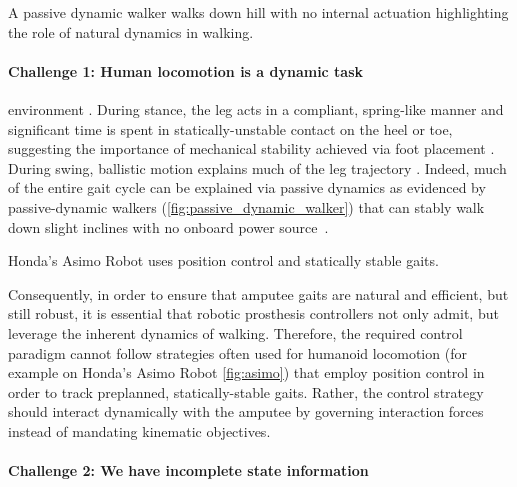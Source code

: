 \begin{marginfigure}
    \centering
    \caption{A passive dynamic walker walks down hill with no internal
    actuation highlighting the role of natural dynamics in walking.}
    \label{fig:passive_dynamic_walker}
\end{marginfigure}

\paragraph{Challenge 1: Human locomotion is a dynamic task}
environment \citep{mcgeer_1992}. During stance, the leg acts in a compliant,
spring-like manner \citep{geyer2006compliant} and significant time is spent
in statically-unstable contact on the heel or toe, suggesting the importance
of mechanical stability achieved via foot placement \citep{perry1992gait}.
During swing, ballistic motion explains much of the leg trajectory
\citep{mochon1980ballistic}. Indeed, much of the entire gait cycle can be
explained via passive dynamics as evidenced by passive-dynamic walkers
(\cref{fig:passive_dynamic_walker}) that can stably walk down slight
inclines with no onboard power source~\citep{mcgeer1990passive,
collins2005efficient}.

\begin{marginfigure}
    \centering
    \caption{Honda's Asimo Robot uses position control and statically
    stable gaits.}
    \label{fig:asimo}
\end{marginfigure}

Consequently, in order to ensure that amputee gaits are natural and efficient,
but still robust, it is essential that robotic prosthesis controllers not only
admit, but leverage the inherent dynamics of walking.  Therefore, the required
control paradigm cannot follow strategies often used for humanoid locomotion
(for example on Honda's Asimo Robot \cref{fig:asimo}) that employ position
control in order to track preplanned, statically-stable gaits. Rather, the
control strategy should interact dynamically with the amputee by governing
interaction forces instead of mandating kinematic objectives.

\paragraph{Challenge 2: We have incomplete state information}

